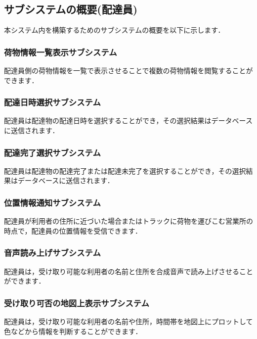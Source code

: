 \documentclass[a4j,titlepage]{jarticle}
\begin{document}
\newpage

\subsection{サブシステムの概要(配達員)}
本システム内を構築するためのサブシステムの概要を以下に示します．

\subsubsection{荷物情報一覧表示サブシステム}
配達員側の荷物情報を一覧で表示させることで複数の荷物情報を閲覧することができます．

\subsubsection{配達日時選択サブシステム}
配達員は配達物の配達日時を選択することができ，その選択結果はデータベースに送信されます．

\subsubsection{配達完了選択サブシステム}
配達員は配達物の配達完了または配達未完了を選択することができ，その選択結果はデータベースに送信されます．

\subsubsection{位置情報通知サブシステム}
配達員が利用者の住所に近づいた場合またはトラックに荷物を運びこむ営業所の時点で，配達員の位置情報を受信できます．

\subsubsection{音声読み上げサブシステム}
配達員は，受け取り可能な利用者の名前と住所を合成音声で読み上げさせることができます．


\subsubsection{受け取り可否の地図上表示サブシステム}
配達員は，受け取り可能な利用者の名前や住所，時間帯を地図上にプロットして色などから情報を判断することができます．
\end{document}
